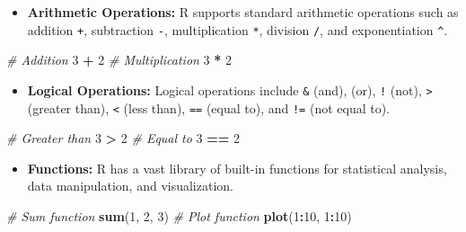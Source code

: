 \documentclass[
]{book}
\newenvironment{Shaded}{\begin{snugshade}}{\end{snugshade}}
\newcommand{\CommentTok}[1]{\textcolor[rgb]{0.56,0.35,0.01}{\textit{#1}}}
\newcommand{\DecValTok}[1]{\textcolor[rgb]{0.00,0.00,0.81}{#1}}
\newcommand{\FunctionTok}[1]{\textcolor[rgb]{0.13,0.29,0.53}{\textbf{#1}}}
\newcommand{\NormalTok}[1]{#1}
\newcommand{\SpecialCharTok}[1]{\textcolor[rgb]{0.81,0.36,0.00}{\textbf{#1}}}
\providecommand{\tightlist}{%
  \setlength{\itemsep}{0pt}\setlength{\parskip}{0pt}}
\begin{document}
\begin{itemize}
\tightlist
\item
  \textbf{Arithmetic Operations:} R supports standard arithmetic operations such as addition \texttt{+}, subtraction \texttt{-}, multiplication \texttt{*}, division \texttt{/}, and exponentiation \texttt{\^{}}.
\end{itemize}

\begin{Shaded}
\begin{Highlighting}[]
\CommentTok{\# Addition}
\DecValTok{3} \SpecialCharTok{+} \DecValTok{2}
\CommentTok{\# Multiplication}
\DecValTok{3} \SpecialCharTok{*} \DecValTok{2}
\end{Highlighting}
\end{Shaded}

\begin{itemize}
\tightlist
\item
  \textbf{Logical Operations:} Logical operations include \texttt{\&} (and), \texttt{\textbar{}} (or), \texttt{!} (not), \texttt{\textgreater{}} (greater than), \texttt{\textless{}} (less than), \texttt{==} (equal to), and \texttt{!=} (not equal to).
\end{itemize}

\begin{Shaded}
\begin{Highlighting}[]
\CommentTok{\# Greater than}
\DecValTok{3} \SpecialCharTok{\textgreater{}} \DecValTok{2}
\CommentTok{\# Equal to}
\DecValTok{3} \SpecialCharTok{==} \DecValTok{2}
\end{Highlighting}
\end{Shaded}

\begin{itemize}
\tightlist
\item
  \textbf{Functions:} R has a vast library of built-in functions for statistical analysis, data manipulation, and visualization.
\end{itemize}

\begin{Shaded}
\begin{Highlighting}[]
\CommentTok{\# Sum function}
\FunctionTok{sum}\NormalTok{(}\DecValTok{1}\NormalTok{, }\DecValTok{2}\NormalTok{, }\DecValTok{3}\NormalTok{)}
\CommentTok{\# Plot function}
\FunctionTok{plot}\NormalTok{(}\DecValTok{1}\SpecialCharTok{:}\DecValTok{10}\NormalTok{, }\DecValTok{1}\SpecialCharTok{:}\DecValTok{10}\NormalTok{)}
\end{Highlighting}
\end{Shaded}
\end{document}
